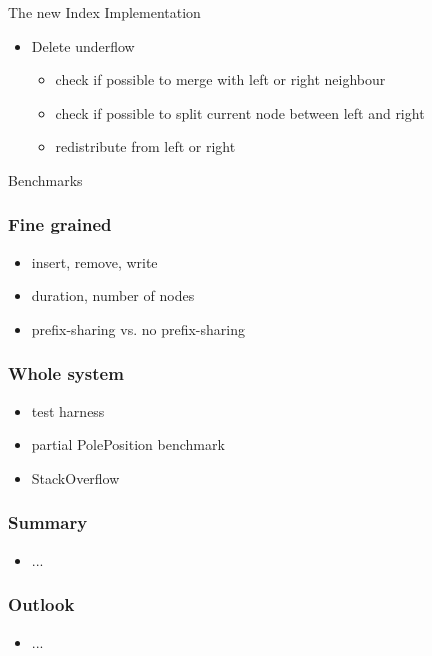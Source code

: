 \documentclass{beamer}
\begin{document}
\begin{section}{The new Index Implementation}
\begin{frame}
\begin{itemize}
            \begin{itemize}
            \item attempt to redistribute values to left sibling before creating a new node
            \end{itemize}
        \item Delete underflow
            \begin{itemize}
            \item check if possible to merge with left or right neighbour
            \item check if possible to split current node between left and right
            \item redistribute from left or right
            \end{itemize}
        \end{itemize}
    \end{frame}
  \end{section}

  \begin{section}{Benchmarks}
    \begin{frame}
      \frametitle{Fine grained}
        \begin{itemize}
          \item insert, remove, write
          \item duration, number of nodes
          \item prefix-sharing vs. no prefix-sharing
        \end{itemize}
    \end{frame}
    \begin{frame}
      \frametitle{Whole system}
        \begin{itemize}
          \item test harness
          \item partial PolePosition benchmark
          \item StackOverflow
        \end{itemize}
    \end{frame}
  \end{section}

  \begin{frame}
    \frametitle{Summary}
      \begin{itemize}
        \item ...
      \end{itemize}
  \end{frame}

  \begin{frame}
    \frametitle{Outlook}
      \begin{itemize}
        \item ...
      \end{itemize}
  \end{frame}
\end{document}
